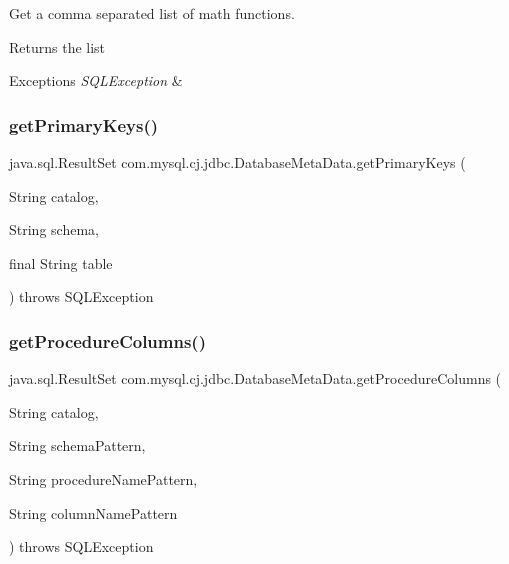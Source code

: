 Get a comma separated list of math functions.

\begin{DoxyReturn}{Returns}
the list 
\end{DoxyReturn}

\begin{DoxyExceptions}{Exceptions}
{\em S\+Q\+L\+Exception} & \\
\hline
\end{DoxyExceptions}
\mbox{\label{classcom_1_1mysql_1_1cj_1_1jdbc_1_1_database_meta_data_a54a97d018612f19a9b905116d7e0459e}} 
\subsubsection{\texorpdfstring{get\+Primary\+Keys()}{getPrimaryKeys()}}
{\footnotesize\ttfamily java.\+sql.\+Result\+Set com.\+mysql.\+cj.\+jdbc.\+Database\+Meta\+Data.\+get\+Primary\+Keys (\begin{DoxyParamCaption}\item[{String}]{catalog,  }\item[{String}]{schema,  }\item[{final String}]{table }\end{DoxyParamCaption}) throws S\+Q\+L\+Exception}

\mbox{\label{classcom_1_1mysql_1_1cj_1_1jdbc_1_1_database_meta_data_a29901815ccefc6bb74988a76bb8545f1}} 
\subsubsection{\texorpdfstring{get\+Procedure\+Columns()}{getProcedureColumns()}}
{\footnotesize\ttfamily java.\+sql.\+Result\+Set com.\+mysql.\+cj.\+jdbc.\+Database\+Meta\+Data.\+get\+Procedure\+Columns (\begin{DoxyParamCaption}\item[{String}]{catalog,  }\item[{String}]{schema\+Pattern,  }\item[{String}]{procedure\+Name\+Pattern,  }\item[{String}]{column\+Name\+Pattern }\end{DoxyParamCaption}) throws S\+Q\+L\+Exception}

